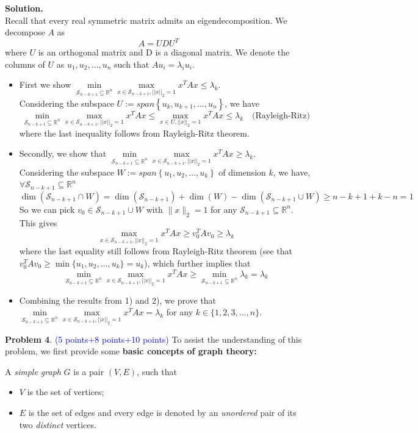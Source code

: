 \documentclass[english,onecolumn]{IEEEtran}
\newcommand{\Rbb}{\mathbb{R}}
\newcommand{\bigS}{\mathcal{S}}
\begin{document}
\noindent
\textbf{Solution.}\\
Recall that every real symmetric matrix admits an eigendecomposition. We decompose $A$ as 
$$A = UDU^T$$
where $U$ is an orthogonal matrix and D is a diagonal matrix. We denote the columns of $U$ as $u_1,u_2,...,u_n$ such that $Au_i = \lambda_i u_i$. 
\begin{itemize}
	\item First we show $\min\limits_{\bigS_{n-k+1}\subseteq \Rbb^n}\max\limits_{x\in\bigS_{n-k+1},||x||_2=1} x^TAx \le \lambda_k$.\\
	Considering the subspace $U:=span\left\{ u_k, u_{k+1},...,u_n\right\}$, we have
	$$\min\limits_{\bigS_{n-k+1}\subseteq \Rbb^n}\max\limits_{x\in\bigS_{n-k+1},||x||_2=1} x^TAx \le \max\limits_{x\in U,||x||_2=1} x^TAx \le \lambda_k \quad \text{(Rayleigh-Ritz)}$$
	where the last inequality follows from Rayleigh-Ritz theorem.
	\item Secondly, we show that $\min\limits_{\bigS_{n-k+1}\subseteq \Rbb^n}\max\limits_{x\in\bigS_{n-k+1},||x||_2=1} x^TAx \ge \lambda_k$.
	\\ Considering the subspace $W:=span\left\{ u_1, u_2,...,u_k\right\}$ of dimension $k$, we have, $\forall \bigS_{n-k+1}\subseteq \Rbb^n$
	$$\dim(\bigS_{n-k+1} \cap W) = \dim(\bigS_{n-k+1}) + \dim(W) - \dim(\bigS_{n-k+1} \cup W)\ge n-k+1 +k-n = 1$$
	So we can pick $v_0 \in \bigS_{n-k+1} \cup W$ with $\|x\|_2 = 1$ for any $\bigS_{n-k+1}\subseteq \Rbb^n$. This gives 
	$$\max\limits_{x\in\bigS_{n-k+1},||x||_2=1} x^TAx \ge v_0^TAv_0 \ge \lambda_k$$
	where the last equality still follows from Rayleigh-Ritz theorem (see that $v_0^TAv_0 \ge \min \{u_1,u_2,...,u_k\} = u_k$), which further implies that 
	$$\min\limits_{\bigS_{n-k+1}\subseteq \Rbb^n}\max\limits_{x\in\bigS_{n-k+1},||x||_2=1} x^TAx \ge \min\limits_{\bigS_{n-k+1}\subseteq \Rbb^n} \lambda_k = \lambda_k$$
	\item Combining the results from 1) and 2), we prove that $\min\limits_{\bigS_{n-k+1}\subseteq \Rbb^n}\max\limits_{x\in\bigS_{n-k+1},||x||_2=1} x^TAx = \lambda_k$ for any $k\in\{1,2,3,...,n\}$.
\end{itemize}

	
	
 
\newpage
\noindent\textbf{Problem 4}. \textcolor{blue}{(5 points+8 points+10 points)}
\noindent To assist the understanding of this problem, we first provide some \textbf{basic concepts of graph theory:}
 
 A \textit{simple graph} $G$ is a pair $(V,E)$, such that
\begin{itemize}
	\item 
	$V$ is the set of vertices;
	
	\item 
	$E$ is the set of edges and every edge is denoted by an \textit{unordered} pair of its two \textit{distinct} vertices.
\end{itemize}
\end{document}
